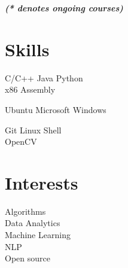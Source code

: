 \documentclass[a4paper]{deedy-resume} %
\begin{document}
\begin{minipage}[t]{0.33\textwidth}
  {\footnotesize \textit{\textbf{(* denotes ongoing courses) }}} \\

  \sectionspace

  \section{Skills}

  \runsubsection{}
  C/C++ \textbullet{} Java \textbullet{} Python \\
  \textbullet{} x86 Assembly

  \sectionspace
  \sectionspace

  Ubuntu \textbullet{} Microsoft Windows

  \sectionspace
  \sectionspace

  Git \textbullet{} Linux Shell  \\
  \textbullet{} OpenCV

  \sectionspace
  \sectionspace

  \section{Interests}
  Algorithms \\
  Data Analytics \\
  Machine Learning \\
  NLP \\
  Open source \\
\end{minipage}
\hfill
\end{document}
